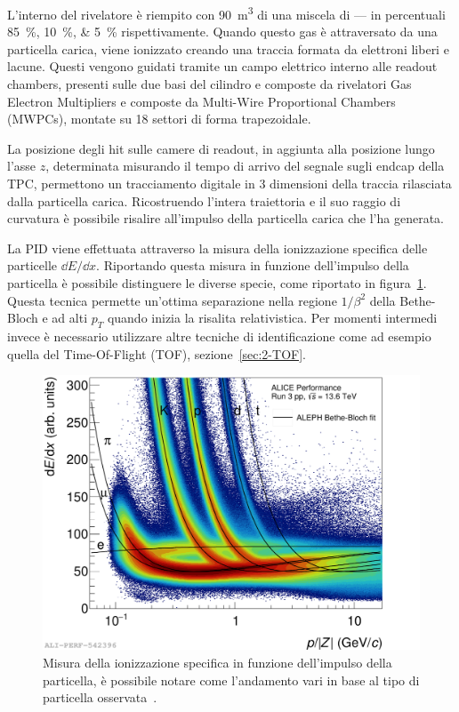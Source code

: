     L’interno del rivelatore è riempito con \qty{90}{\meter^3} di una miscela di ---- in percentuali \qtylist{85;10;5}{\percent} rispettivamente. Quando questo gas è attraversato da una particella carica, viene ionizzato creando una traccia formata da elettroni liberi e lacune. Questi vengono guidati tramite un campo elettrico interno alle readout chambers, presenti sulle due basi del cilindro e composte da rivelatori Gas Electron Multipliers e composte da Multi-Wire Proportional Chambers (MWPCs), montate su 18 settori di forma trapezoidale.
    
    La posizione degli hit sulle camere di readout, in aggiunta alla posizione lungo l’asse $z$, determinata misurando il tempo di arrivo del segnale sugli endcap della TPC, permettono un tracciamento digitale in 3 dimensioni della traccia rilasciata dalla particella carica. Ricostruendo l’intera traiettoria e il suo raggio di curvatura è possibile risalire all’impulso della particella carica che l’ha generata.
    
    La PID viene effettuata attraverso la misura della ionizzazione specifica delle particelle $\dd{E}\!/\!\dd{x}$. Riportando questa misura in funzione dell’impulso della particella è possibile distinguere le diverse specie, come riportato in figura~\ref{fig:2-6-ALICE-pp13.6TeV-performance}. Questa tecnica permette un'ottima separazione nella regione $1/\beta^2$ della Bethe-Bloch e ad alti $p_{T}$ quando inizia la risalita relativistica. Per momenti intermedi invece è necessario utilizzare altre tecniche di identificazione come ad esempio quella del Time-Of-Flight (TOF), sezione~\ref{sec:2-TOF}.

    \begin{figure}[p]
        \centering
        \includegraphics[width=1\linewidth]{res/fig/2-chapter/6-ALICE-pp13.6TeV-performance.pdf}
        \caption{Misura della ionizzazione specifica in funzione dell’impulso della particella, è possibile notare come l’andamento vari in base al tipo di particella osservata~\cite{ALICE-pp13.6TeV-performance}.}
        \label{fig:2-6-ALICE-pp13.6TeV-performance}
    \end{figure}

